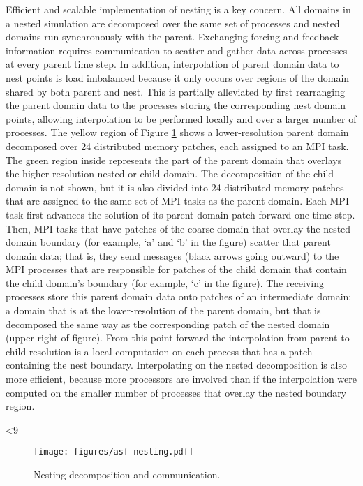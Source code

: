 Efficient and scalable implementation of nesting is a key concern. All
domains in a nested simulation are decomposed over the same set of
processes and nested domains run synchronously with the parent.
Exchanging forcing and feedback information requires communication to
scatter and gather data across processes at every parent time step. In
addition, interpolation of parent domain data to nest points is load
imbalanced because it only occurs over regions of the domain shared by
both parent and nest. This is partially alleviated by first rearranging
the parent domain data to the processes storing the corresponding nest
domain points, allowing interpolation to be performed locally and over
a larger number of processes.  The yellow region of Figure
\ref{figure:5} shows a lower-resolution parent domain decomposed over
24 distributed memory patches, each assigned to an MPI task.  The green
region inside represents the part of the parent domain that overlays
the higher-resolution nested or child domain. The decomposition of the
child domain is not shown, but it is also divided into 24 distributed
memory patches that are assigned to the same set of MPI tasks as the
parent domain. Each MPI task first advances the solution of its
parent-domain patch forward one time step. Then, MPI tasks that have
patches of the coarse domain that overlay the nested domain boundary
(for example, `a' and `b' in the figure) scatter that parent domain
data; that is, they send messages (black arrows going outward) to the
MPI processes that are responsible for patches of the child domain that
contain the child domain's boundary (for example, `c' in the figure).
The receiving processes store this parent domain data onto patches of
an intermediate domain: a domain that is at the lower-resolution of the
parent domain, but that is decomposed the same way as the corresponding
patch of the nested domain (upper-right of figure).
From this point forward the interpolation from parent to child
resolution is a local computation on each process that has a patch
containing the nest boundary.  Interpolating on the nested
decomposition is also more efficient, because more processors are
involved than if the interpolation were computed on the smaller number
of processes that overlay the nested boundary region.

%
%
\ifnum{}<9
\begin{figure}
  \centering
  \texttt{[image: figures/asf-nesting.pdf]}
  \caption{\label{figure:5}Nesting decomposition and communication.}
\end{figure}
\fi

